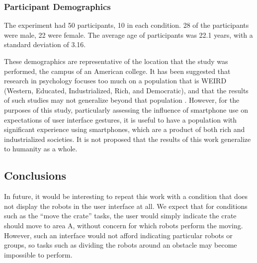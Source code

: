 


\subsubsection{Participant Demographics} \label{section:Participant_Demographics}

The experiment had 50 participants, 10 in each condition. 28 of the participants were male, 22 were female. The average age of participants was 22.1 years, with a standard deviation of 3.16. 

These demographics are representative of the location that the study was performed, the campus of an American college. 
It has been suggested that research in psychology focuses too much on a population that is WEIRD (Western, Educated, Industrialized, Rich, and Democratic), and that the results of such studies may not generalize beyond that population \citep{arnett2008neglected}.
However, for the purposes of this study, particularly assessing the influence of smartphone use on expectations of user interface gestures, it is useful to have a population with significant experience using smartphones, which are a product of both rich and industrialized societies. 
It is not proposed that the results of this work generalize to humanity as a whole.  

\subsection{Conclusions} \label{section:Conclusions}

In future, it would be interesting to repeat this work with a condition that does not display the robots in the user interface at all. 
We expect that for conditions such as the ``move the crate'' tasks, the user would simply indicate the crate should move to area A, without concern for which robots perform the moving. 
However, such an interface would not afford indicating particular robots or groups, so tasks such as dividing the robots around an obstacle may become impossible to perform.

